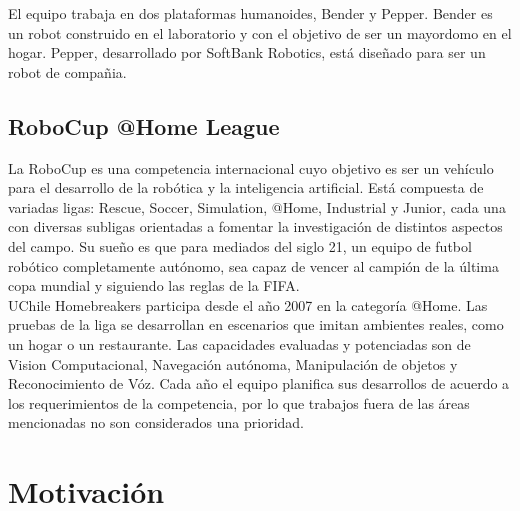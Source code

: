 \documentclass[12pt,letterpaper,spanish]{article}
\begin{document}
El equipo trabaja en dos plataformas humanoides, Bender y Pepper. Bender es un robot construido en el laboratorio y con el objetivo de ser un mayordomo en el hogar. Pepper, desarrollado por SoftBank Robotics, est\'a dise\~nado para ser un robot de compa\~nia.\\


\subsection{RoboCup @Home League}

La RoboCup es una competencia internacional cuyo objetivo es ser un veh\'iculo para el desarrollo de la rob\'otica y la inteligencia artificial. Est\'a compuesta de variadas ligas: Rescue, Soccer, Simulation, @Home, Industrial y Junior, cada una con diversas subligas orientadas a fomentar la investigaci\'on de distintos aspectos del campo. Su sue\~no es que para mediados del siglo 21, un equipo de futbol rob\'otico completamente aut\'onomo, sea capaz de vencer al campi\'on de la última copa mundial y siguiendo las reglas de la FIFA\cite{robocup:rulebook_2017}.\\ 

UChile Homebreakers participa desde el a\~no 2007 en la categor\'ia @Home. Las pruebas de la liga se desarrollan en escenarios que imitan ambientes reales, como un hogar o un restaurante. Las capacidades evaluadas y potenciadas son de Vision Computacional, Navegaci\'on aut\'onoma, Manipulaci\'on de objetos y Reconocimiento de V\'oz. Cada a\~no el equipo planifica sus desarrollos de acuerdo a los requerimientos de la competencia, por lo que trabajos fuera de las \'areas mencionadas no son considerados una prioridad.\\

%
%
%

\section{Motivaci\'on}
\end{document}
